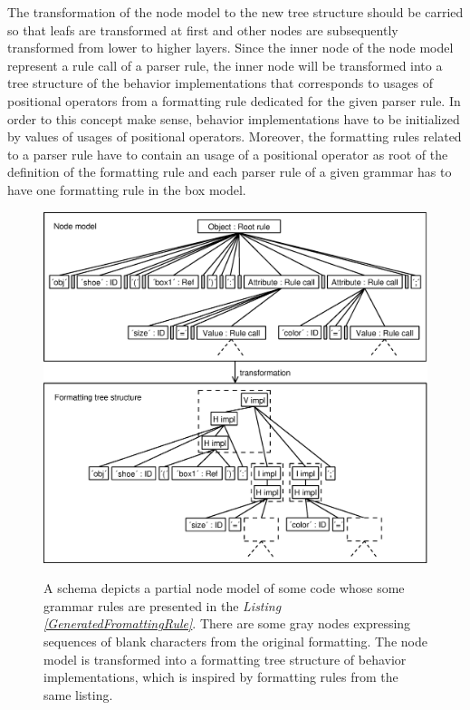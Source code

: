 \documentclass[12pt,notitlepage,a4paper]{report}
\begin{document}
The transformation of the node model to the new tree structure should be carried so that leafs are transformed at first and other nodes are subsequently transformed from lower to higher layers. Since the inner node of the node model represent a rule call of a parser rule, the inner node will be transformed into a tree structure of the behavior implementations that corresponds to usages of positional operators from a formatting rule dedicated for the given parser rule. In order to this concept make sense, behavior implementations have to be initialized by values of usages of positional operators. Moreover, the formatting rules related to a parser rule have to contain an usage of a positional operator as  root of the definition of the formatting rule and each parser rule of a given grammar has to have one formatting rule in the box model.

\begin{figure}[h!]
\centering
\caption{A schema depicts a partial node model of some code whose some grammar rules are presented in the \textit{Listing \ref{GeneratedFromattingRule}}. There are some gray nodes expressing sequences of blank characters from the original formatting. The node model is transformed into a formatting tree structure of behavior implementations, which is inspired by formatting rules from the same listing.}
\includegraphics[scale=0.51]{pictures/NodeModelFormatting.eps}
\label{NodeModelFormatting}
\end{figure}
\noindent
\end{document}
